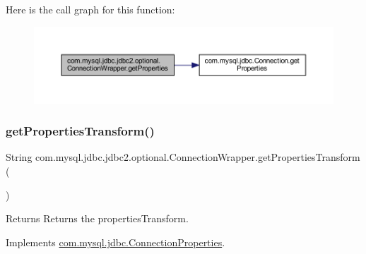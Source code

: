 Here is the call graph for this function\+:
\nopagebreak
\begin{figure}[H]
\begin{center}
\leavevmode
\includegraphics[width=350pt]{classcom_1_1mysql_1_1jdbc_1_1jdbc2_1_1optional_1_1_connection_wrapper_a5f9c13aa2ff933d03836b6217c781fd7_cgraph}
\end{center}
\end{figure}
\mbox{\label{classcom_1_1mysql_1_1jdbc_1_1jdbc2_1_1optional_1_1_connection_wrapper_ab225f27eb5edd605b97f1a646b503144}} 
\subsubsection{\texorpdfstring{get\+Properties\+Transform()}{getPropertiesTransform()}}
{\footnotesize\ttfamily String com.\+mysql.\+jdbc.\+jdbc2.\+optional.\+Connection\+Wrapper.\+get\+Properties\+Transform (\begin{DoxyParamCaption}{ }\end{DoxyParamCaption})}

\begin{DoxyReturn}{Returns}
Returns the properties\+Transform. 
\end{DoxyReturn}


Implements \mbox{\hyperlink{interfacecom_1_1mysql_1_1jdbc_1_1_connection_properties_a0d177b2a7b7de4fc521d3362343375de}{com.\+mysql.\+jdbc.\+Connection\+Properties}}.

